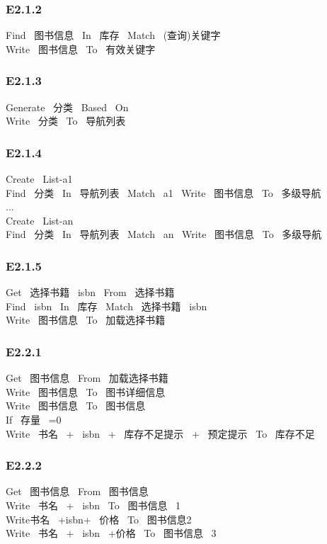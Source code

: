 \subsubsection*{E2.1.2}
Find \ 图书信息 \ In \ 库存 \ Match \ (查询)关键字\\ 
Write \ 图书信息 \ To \ 有效关键字\\ 
\vspace{-1mm}
\subsubsection*{E2.1.3}
Generate \ {分类} \ Based \ On\\ 
Write \ {分类} \ To \ 导航列表\\ 
\vspace{-1mm}
\subsubsection*{E2.1.4}
Create \ List-a1\\ 
Find \ 分类 \ In \ 导航列表 \ Match \ a1 \ Write \ 图书信息 \ To \ 多级导航\\ 
... \\ 
Create \ List-an\\ 
Find \ 分类 \ In \ 导航列表 \ Match \ an \ Write \ 图书信息 \ To \ 多级导航\\ 
\vspace{-1mm}
\subsubsection*{E2.1.5}
Get \ 选择书籍 \ isbn \ From \ 选择书籍 \\ 
Find \ isbn \ In \ 库存 \ Match \ 选择书籍 \ isbn \\ 
Write \ 图书信息 \ To \ 加载选择书籍\\ 
\vspace{-1mm}
\subsubsection*{E2.2.1}
Get \ 图书信息 \ From \ 加载选择书籍 \\ 
Write \ 图书信息 \ To \ 图书详细信息 \\ 
Write \ 图书信息 \ To \ 图书信息\\ 
If \ 存量 \ =0\\ 
Write \ 书名 \ + \ isbn \ + \ 库存不足提示 \ + \ 预定提示 \ To \ 库存不足\\ 
\vspace{-1mm}
\subsubsection*{E2.2.2}
Get \ 图书信息 \ From \ 图书信息\\ 
Write \ 书名 \ + \ isbn \ To \ 图书信息 \ 1 \\ 
Write书名 \ +isbn+ \ 价格 \ To \ 图书信息2 \\ 
Write \ 书名 \ + \ isbn \ +价格 \ To \ 图书信息 \ 3\\ 
\vspace{-1mm}
